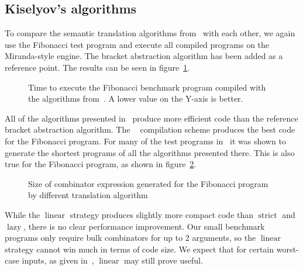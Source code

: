 \documentclass[conference]{IEEEtran}
\DeclareMathOperator{\strict}{strict}
\DeclareMathOperator{\lazy}{lazy}
\DeclareMathOperator{\lazyeta}{lazy_\eta}
\DeclareMathOperator{\linear}{linear}
\begin{document}
\subsection{Kiselyov's algorithms}
To compare the semantic translation algorithms from~\cite{kiselyov_lambda_2018} with each other, we again use the Fibonacci test program and execute all compiled programs on the Miranda-style engine.
The bracket abstraction algorithm has been added as a reference point.
The results can be seen in figure~\ref{fig:bracket-vs-kiselyov}.

\begin{figure}
    
    \centering
    \caption{Time to execute the Fibonacci benchmark program compiled with the algorithms from~\cite{kiselyov_lambda_2018}. A lower value on the Y-axis is better.}
    \label{fig:bracket-vs-kiselyov}
\end{figure}

All of the algorithms presented in~\cite{kiselyov_lambda_2018} produce more efficient code than the reference bracket abstraction algorithm.
The $\lazyeta$ compilation scheme produces the best code for the Fibonacci program.
For many of the test programs in~\cite{kiselyov_lambda_2018} it was shown to generate the shortest programs of all the algorithms presented there.
This is also true for the Fibonacci program, as shown in figure~\ref{fig:fib-sizes}.

\begin{figure}
    \centering
    \caption{Size of combinator expression generated for the Fibonacci program by different translation algorithm}
    \label{fig:fib-sizes}
\end{figure}

While the $\linear$ strategy produces slightly more compact code than $\strict$ and $\lazy$, there is no clear performance improvement.
Our small benchmark programs only require bulk combinators for up to $2$ arguments, so the $\linear$ strategy cannot win much in terms of code size.
We expect that for certain worst-case inputs, as given in~\cite{kiselyov_lambda_2018}, $\linear$ may still prove useful.
\end{document}
